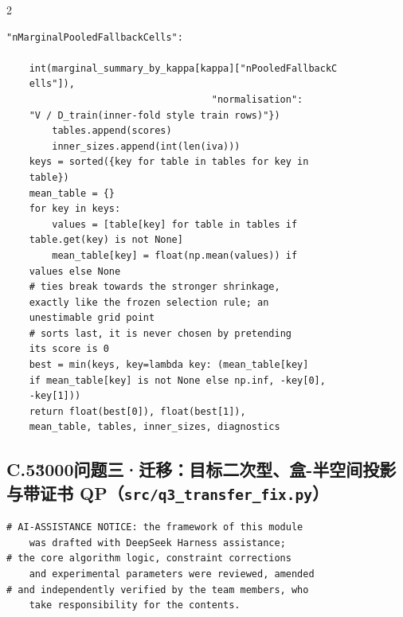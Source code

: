 \begin{multicols}{2}
\begin{Verbatim}[fontsize=\scriptsize]
    "nMarginalPooledFallbackCells":

    int(marginal_summary_by_kappa[kappa]["nPooledFallbackC
    ells"]),
                                    "normalisation":
    "V / D_train(inner-fold style train rows)"})
        tables.append(scores)
        inner_sizes.append(int(len(iva)))
    keys = sorted({key for table in tables for key in
    table})
    mean_table = {}
    for key in keys:
        values = [table[key] for table in tables if
    table.get(key) is not None]
        mean_table[key] = float(np.mean(values)) if
    values else None
    # ties break towards the stronger shrinkage,
    exactly like the frozen selection rule; an
    unestimable grid point
    # sorts last, it is never chosen by pretending
    its score is 0
    best = min(keys, key=lambda key: (mean_table[key]
    if mean_table[key] is not None else np.inf, -key[0],
    -key[1]))
    return float(best[0]), float(best[1]),
    mean_table, tables, inner_sizes, diagnostics
\end{Verbatim}

\subsection*{C.5\u3000问题三·迁移：目标二次型、盒-半空间投影与带证书 QP（\texttt{src/q3\_transfer\_fix.py}）}
\begin{Verbatim}[fontsize=\scriptsize]
# AI-ASSISTANCE NOTICE: the framework of this module
    was drafted with DeepSeek Harness assistance;
# the core algorithm logic, constraint corrections
    and experimental parameters were reviewed, amended
# and independently verified by the team members, who
    take responsibility for the contents.


\end{Verbatim}
\end{multicols}
